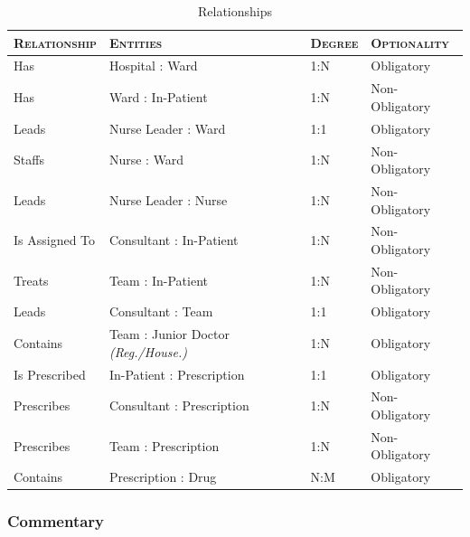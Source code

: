 \documentclass[11pt, english]{article}
\begin{document}
	\begin{table}[h]
                \scriptsize
                \renewcommand{\arraystretch}{1.25}
        \begin{center}
	\begin{tabular}{lp{6cm}ll}
		\textsc{Relationship} & \textsc{Entities} & \textsc{Degree} & \textsc{Optionality}\\
		\hline
		Has & Hospital : Ward & 1:N & Obligatory\\
		Has & Ward : In-Patient & 1:N & Non-Obligatory\\
		Leads & Nurse Leader : Ward & 1:1 & Obligatory\\
		Staffs & Nurse : Ward & 1:N & Non-Obligatory\\
		Leads & Nurse Leader : Nurse & 1:N & Non-Obligatory\\
		Is Assigned To & Consultant : In-Patient & 1:N & Non-Obligatory\\
		Treats & Team : In-Patient & 1:N & Non-Obligatory\\
		Leads & Consultant : Team & 1:1 & Obligatory\\
		Contains & Team : Junior Doctor \textit{(Reg./House.)} & 1:N & Obligatory\\ 
		Is Prescribed & In-Patient : Prescription & 1:1 & Obligatory\\
		Prescribes & Consultant : Prescription & 1:N & Non-Obligatory\\
		Prescribes & Team : Prescription & 1:N & Non-Obligatory\\
		Contains & Prescription : Drug & N:M & Obligatory\\	
		\hline
	\end{tabular}
		\caption{Relationships}
	\end{center}
	\end{table}

		\subsubsection{Commentary}
\end{document}
